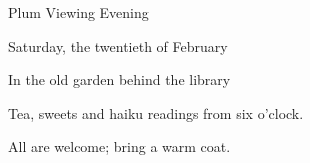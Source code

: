 \documentclass[12pt]{article}
\providecommand\KachoPosterSpawns{}
\begin{document}
\KachoPosterSpawns
\begin{center}
{\LARGE Plum Viewing Evening}\par\bigskip
Saturday, the twentieth of February\par
In the old garden behind the library\par\bigskip
Tea, sweets and haiku readings from six o'clock.\par
All are welcome; bring a warm coat.
\end{center}
\end{document}
